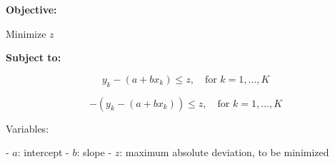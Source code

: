 \documentclass{article}
\begin{document}
\textbf{Objective:}

Minimize \( z \)

\textbf{Subject to:}

\[
y_k - (a + bx_k) \leq z, \quad \text{for } k = 1, \ldots, K
\]

\[
-(y_k - (a + bx_k)) \leq z, \quad \text{for } k = 1, \ldots, K
\]

Variables:

- \( a \): intercept
- \( b \): slope
- \( z \): maximum absolute deviation, to be minimized
\end{document}
